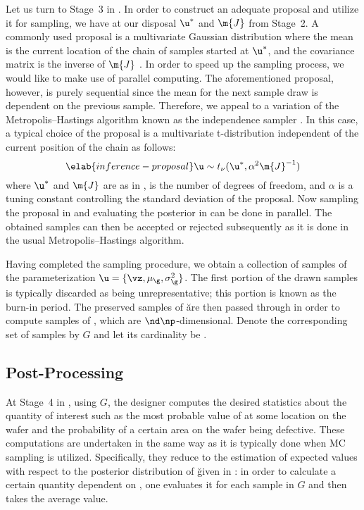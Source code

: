 Let us turn to Stage~3 in . In order to construct an
adequate proposal and utilize it for sampling, we have at our disposal $\u^*$
and $\m{J}$ from Stage~2. A commonly used proposal is a multivariate Gaussian
distribution where the mean is the current location of the chain of samples
started at $\u^*$, and the covariance matrix is the inverse of $\m{J}$
\cite{gelman2013}. In order to speed up the sampling process, we would like to
make use of parallel computing. The aforementioned proposal, however, is purely
sequential since the mean for the next sample draw is dependent on the previous
sample. Therefore, we appeal to a variation of the Metropolis--Hastings
algorithm known as the independence sampler \cite{gelman2013}. In this case, a
typical choice of the proposal is a multivariate t-distribution independent of
the current position of the chain as follows:
\begin{equation} \elab{inference-proposal}
  \u \sim t_\nu(\u^*, \alpha^2 \m{J}^{-1})
\end{equation}
where $\u^*$ and $\m{J}$ are as in , \nu is the
number of degrees of freedom, and $\alpha$ is a tuning constant controlling the
standard deviation of the proposal. Now sampling the proposal in
 and evaluating the posterior in
 can be done in parallel. The obtained samples can
then be accepted or rejected subsequently as it is done in the usual
Metropolis--Hastings algorithm.

Having completed the sampling procedure, we obtain a collection of samples of
the parameterization $\u = \{ \vz, \mu_\g, \sigma^2_\g \}$. The first portion of
the drawn samples is typically discarded as being unrepresentative; this portion
is known as the burn-in period. The preserved samples of \u are then passed
through  in order to compute samples of \g, which are
$\nd \np$-dimensional. Denote the corresponding set of samples by $G$ and let
its cardinality be \no.

\subsection{Post-Processing}

At Stage~4 in , using $G$, the designer computes the
desired statistics about the quantity of interest \g such as the most probable
value of \g at some location on the wafer and the probability of a certain area
on the wafer being defective. These computations are undertaken in the same way
as it is typically done when \ac{MC} sampling is utilized. Specifically, they
reduce to the estimation of expected values with respect to the posterior
distribution of \u given in : in order to calculate a
certain quantity dependent on \g, one evaluates it for each sample in $G$ and
then takes the average value.

